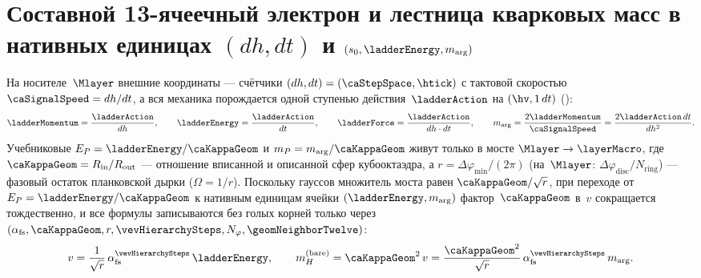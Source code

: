 \section{Составной 13-ячеечный электрон и лестница кварковых масс в нативных единицах \texorpdfstring{$(dh,dt)$}{(dh,dt)} и \texorpdfstring{$(s_0,\ladderEnergy,m_{\arg})$}{(s0,E0,marg)}}
\label{sec:floor2-quark-masses-natural}

На носителе~$\Mlayer$ внешние координаты --- счётчики $(dh,dt)=(\caStepSpace,\htick)$ с тактовой скоростью
$\caSignalSpeed=dh/dt$, а вся механика порождается одной ступенью действия~$\ladderAction$ на $(\hv,1\,dt)$
():
\[
  \ladderMomentum=\frac{\ladderAction}{dh},\qquad
  \ladderEnergy=\frac{\ladderAction}{dt},\qquad
  \ladderForce=\frac{\ladderAction}{dh\cdot dt},\qquad
  m_{\arg}=\frac{2\ladderMomentum}{\caSignalSpeed}=\frac{2\ladderAction\,dt}{dh^2}.
\]
Учебниковые $E_P=\ladderEnergy/\caKappaGeom$ и $m_P=m_{\arg}/\caKappaGeom$
живут только в мосте $\Mlayer\to\layerMacro$, где $\caKappaGeom=R_{\mathrm{in}}/R_{\mathrm{out}}$ ---
отношение вписанной и описанной сфер кубооктаэдра, а $r=\Delta\varphi_{\min}/(2\pi)$
(на~$\Mlayer$: $\Delta\varphi_{\mathrm{disc}}/N_{\mathrm{ring}}$) --- фазовый остаток планковской дырки ($\Omega=1/r$).
Поскольку гауссов множитель моста равен $\caKappaGeom/\sqrt{r}$, при переходе от $E_P=\ladderEnergy/\caKappaGeom$
к нативным единицам ячейки $(\ladderEnergy,m_{\arg})$ фактор~$\caKappaGeom$ в~$v$ сокращается тождественно,
и все формулы записываются без голых корней только через $(\alpha_{\mathrm{fs}},\caKappaGeom,r,\vevHierarchySteps,N_\varphi,\geomNeighborTwelve)$:
\[
  v = \frac{1}{\sqrt{r}}\,\alpha_{\mathrm{fs}}^{\vevHierarchySteps}\,\ladderEnergy,\qquad
  m_H^{(\mathrm{bare})} = \caKappaGeom^2\,v = \frac{\caKappaGeom^2}{\sqrt{r}}\,\alpha_{\mathrm{fs}}^{\vevHierarchySteps}\,m_{\arg}.
\]

